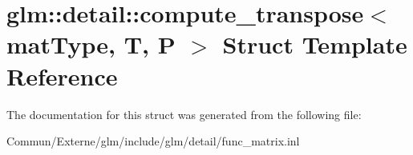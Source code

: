 \hypertarget{structglm_1_1detail_1_1compute__transpose}{}\section{glm\+:\+:detail\+:\+:compute\+\_\+transpose$<$ mat\+Type, T, P $>$ Struct Template Reference}
\label{structglm_1_1detail_1_1compute__transpose}


The documentation for this struct was generated from the following file\+:\begin{DoxyCompactItemize}
\item 
Commun/\+Externe/glm/include/glm/detail/func\+\_\+matrix.\+inl\end{DoxyCompactItemize}

